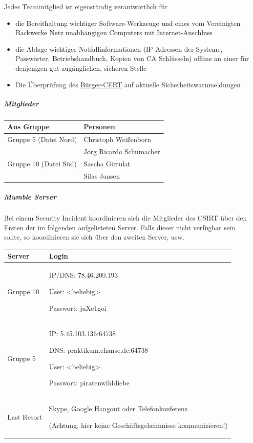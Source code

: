 \documentclass[]{article}
\let\oldsubparagraph\subparagraph
\renewcommand{\subparagraph}[1]{\oldsubparagraph{#1}\mbox{}}
\begin{document}
Jedes Teammitglied ist eigenständig verantwortlich für

\begin{itemize}
\item
  die Bereithaltung wichtiger Software-Werkzeuge und eines vom
  Vereinigten Backwerke Netz unabhängigen Computers mit
  Internet-Anschluss
\item
  die Ablage wichtiger Notfallinformationen (IP-Adressen der Systeme,
  Passwörter, Betriebshandbuch, Kopien von CA Schlüsseln) offline an
  einer für denjenigen gut zugänglichen, sicheren Stelle
\item
  Die Überprüfung des
  \href{https://www.buerger-cert.de/archive?type=WIDTechnicalWarning}{Bürger-CERT}
  auf aktuelle Sicherheitswarnmeldungen
\end{itemize}

\subparagraph{Mitglieder}\label{mitglieder}
\begin{longtable}{ll}
\toprule
Aus Gruppe & Personen\tabularnewline
\midrule
Gruppe 5 (Datei Nord) & Christoph Weißenborn\\
                      & Jörg Ricardo Schumacher\tabularnewline
Gruppe 10 (Datei Süd) & Sascha Girrulat\\
                      & Silas Jansen\tabularnewline
\bottomrule
\end{longtable}

\subparagraph{Mumble Server}\label{mumble-server}

Bei einem Security Incident koordinieren sich die Mitglieder des CSIRT
über den Ersten der im folgenden aufgelisteten Server. Falls dieser
nicht verfügbar sein sollte, so koordinieren sie sich über den zweiten
Server, usw.

\begin{longtable}{lp{6cm}}
\toprule
Server & Login\tabularnewline
\midrule
Gruppe 10 & IP/DNS: 78.46.200.193

User: \textless{}beliebig\textgreater{}

Passwort: juXe1goi\tabularnewline
Gruppe 5 & IP: 5.45.103.136:64738

DNS: praktikum.ehanse.de:64738

User: \textless{}beliebig\textgreater{}

Passwort: piratenwilddiebe\tabularnewline
Last Resort & Skype, Google Hangout oder Telefonkonferenz

(Achtung, hier keine Geschäftsgeheimnisse kommunizieren!)\tabularnewline
\bottomrule
\end{longtable}
\end{document}
